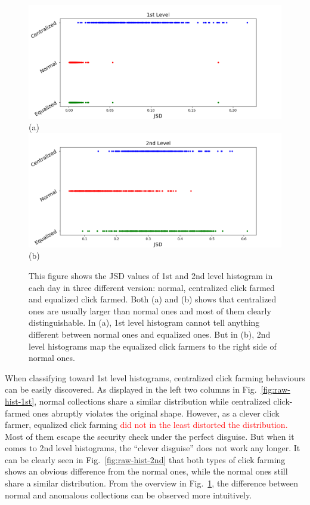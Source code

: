 \documentclass[10pt,conference,letterpaper]{IEEEtran}
\begin{document}
			\begin{figure}[!t]
				\centering
				\includegraphics[width=\linewidth]{fig/RawOverview1st.png}
				(a)
				\includegraphics[width=\linewidth]{fig/RawOverview2nd.png}
				(b)
				\caption{This figure shows the JSD values of 1st and 2nd level histogram in each day in three different version: normal, centralized click farmed and equalized click farmed. Both (a) and (b) shows that centralized ones are usually larger than normal ones and most of them clearly distinguishable. In (a), 1st level histogram cannot tell anything different between normal ones and equalized ones. But in (b), 2nd level histograms map the equalized click farmers to the right side of normal ones.}
				\label{fig:raw-overview}
			\end{figure}
	
			When classifying toward 1st level histograms, centralized click farming behaviours can be easily discovered. As displayed in the left two columns in Fig.~\ref{fig:raw-hist-1st}, normal collections share a similar distribution while centralized click-farmed ones abruptly violates the original shape. However, as a clever click farmer, equalized click farming \textcolor{red}{did not in the least distorted the distribution.} Most of them escape the security check under the perfect disguise.
			But when it comes to 2nd level histograms, the ``clever disguise'' does not work any longer. It can be clearly seen in Fig.~\ref{fig:raw-hist-2nd} that both types of click farming shows an obvious difference from the normal ones, while the normal ones still share a similar distribution.
			From the overview in Fig.~\ref{fig:raw-overview}, the difference between normal and anomalous collections can be observed more intuitively.
	
\end{document}
